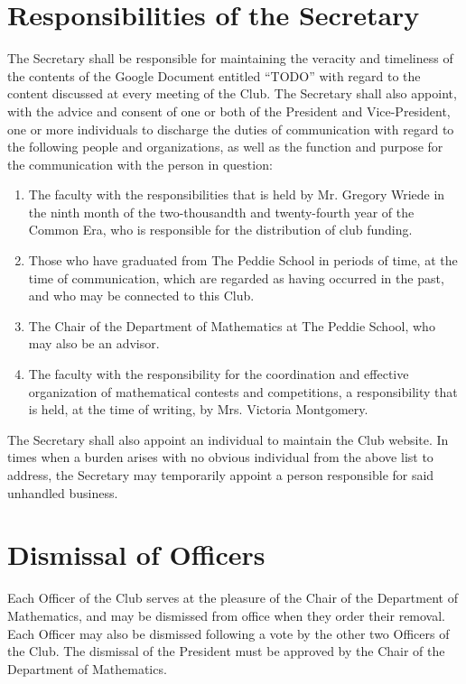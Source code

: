 \documentclass[12pt, letterpaper]{article}
\begin{document}
\section{Responsibilities of the Secretary}
The Secretary shall be responsible for maintaining the veracity and timeliness of the contents of the Google Document entitled ``TODO'' with regard to the content discussed at every meeting of the Club. The Secretary shall also appoint, with the advice and consent of one or both of the President and Vice-President, one or more individuals to discharge the duties of communication with regard to the following people and organizations, as well as the function and purpose for the communication with the person in question:
\begin{enumerate}
	\item The faculty with the responsibilities that is held by Mr. Gregory Wriede in the ninth month of the two-thousandth and twenty-fourth year of the Common Era, who is responsible for the distribution of club funding.
	\item Those who have graduated from The Peddie School in periods of time, at the time of communication, which are regarded as having occurred in the past, and who may be connected to this Club.
	\item The Chair of the Department of Mathematics at The Peddie School, who may also be an advisor.
	\item The faculty with the responsibility for the coordination and effective organization of mathematical contests and competitions, a responsibility that is held, at the time of writing, by Mrs. Victoria Montgomery.
\end{enumerate}
The Secretary shall also appoint an individual to maintain the Club website. In times when a burden arises with no obvious individual from the above list to address, the Secretary may temporarily appoint a person responsible for said unhandled business.

\section{Dismissal of Officers}
Each Officer of the Club serves at the pleasure of the Chair of the Department of Mathematics, and may be dismissed from office when they order their removal. Each Officer may also be dismissed following a vote by the other two Officers of the Club. The dismissal of the President must be approved by the Chair of the Department of Mathematics. 
\end{document}
